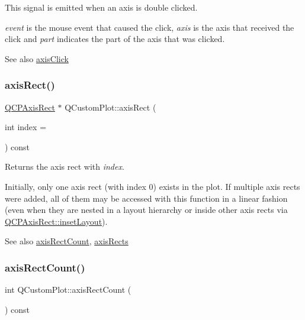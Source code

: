 This signal is emitted when an axis is double clicked.

{\itshape event} is the mouse event that caused the click, {\itshape axis} is the axis that received the click and {\itshape part} indicates the part of the axis that was clicked.

\begin{DoxySeeAlso}{See also}
\mbox{\hyperlink{class_q_custom_plot_abf635f8b56ab5c16d5de9f358543e82b}{axis\+Click}} 
\end{DoxySeeAlso}
\mbox{\label{class_q_custom_plot_ae5eefcb5f6ca26689b1fd4f6e25b42f9}} 
\subsubsection{\texorpdfstring{axis\+Rect()}{axisRect()}}
{\footnotesize\ttfamily \mbox{\hyperlink{class_q_c_p_axis_rect}{Q\+C\+P\+Axis\+Rect}} $\ast$ Q\+Custom\+Plot\+::axis\+Rect (\begin{DoxyParamCaption}\item[{int}]{index = {} }\end{DoxyParamCaption}) const}

Returns the axis rect with {\itshape index}.

Initially, only one axis rect (with index 0) exists in the plot. If multiple axis rects were added, all of them may be accessed with this function in a linear fashion (even when they are nested in a layout hierarchy or inside other axis rects via \mbox{\hyperlink{class_q_c_p_axis_rect_a949f803466619924c7018df4b511ae10}{Q\+C\+P\+Axis\+Rect\+::inset\+Layout}}).

\begin{DoxySeeAlso}{See also}
\mbox{\hyperlink{class_q_custom_plot_a8f85940aaac50efb466287d9d2d04ec6}{axis\+Rect\+Count}}, \mbox{\hyperlink{class_q_custom_plot_a12af771429e2d7e313c8c5d5fca068fe}{axis\+Rects}} 
\end{DoxySeeAlso}
\mbox{\label{class_q_custom_plot_a8f85940aaac50efb466287d9d2d04ec6}} 
\subsubsection{\texorpdfstring{axis\+Rect\+Count()}{axisRectCount()}}
{\footnotesize\ttfamily int Q\+Custom\+Plot\+::axis\+Rect\+Count (\begin{DoxyParamCaption}{ }\end{DoxyParamCaption}) const}

